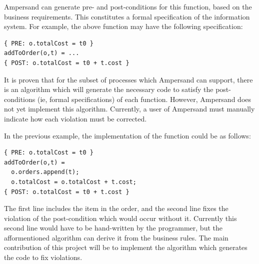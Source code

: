 \documentclass[12pt]{report}
\begin{document}
Ampersand can generate pre- and post-conditions for this function, based on the
business requirements. This constitutes a formal specification of the
information system. For example, the above function may have the following specification:

\begin{verbatim}
{ PRE: o.totalCost = t0 } 
addToOrder(o,t) = ...
{ POST: o.totalCost = t0 + t.cost } 
\end{verbatim}

It is proven  %
%
that for the subset of processes which Ampersand can support, there is an
algorithm which will generate the necessary code to satisfy the post-conditions
(ie, formal specifications) of each function. However, Ampersand does not yet
implement this algorithm. Currently, a user of Ampersand must manually indicate
how each violation must be corrected.

In the previous example, the implementation of the
function could be as follows: 

\begin{verbatim}
{ PRE: o.totalCost = t0 } 
addToOrder(o,t) = 
  o.orders.append(t);
  o.totalCost = o.totalCost + t.cost;
{ POST: o.totalCost = t0 + t.cost } 
\end{verbatim}

The first line includes the item in the order, and the second line fixes the
violation of the post-condition which would occur without it. Currently this
second line would have to be hand-written by the programmer, but the
afformentioned  algorithm can derive it from the business rules. The main
contribution of this project will be to implement the algorithm which generates
the code to fix violations.
\end{document}
